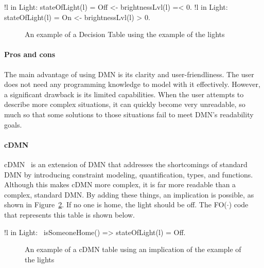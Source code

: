 \documentclass[11pt,a4paper]{report}
\newcommand{\fodot}{FO($\cdot$)\xspace}
\begin{document}
\begin{idplisting}
{
   !l in Light: stateOfLight(l) = Off <- brightnessLvl(l) =< 0.
   !l in Light: stateOfLight(l) = On <- brightnessLvl(l) > 0.
}
\end{idplisting}

\begin{figure}
    \centering
    \caption{An example of a Decision Table using the example of the lights}
    \label{fig:DT}
\end{figure}


\paragraph{ Pros and cons}
The main advantage of using DMN is its clarity and user-friendliness. The user does not need any programming knowledge to model with it effectively. However, a significant drawback is its limited capabilities. When the user attempts to describe more complex situations, it can quickly become very unreadable, so much so that some solutions to those situations fail to meet DMN's readability goals.
 
\paragraph{cDMN}
cDMN~\cite{cDMN} is an extension of DMN that addresses the shortcomings of standard DMN by introducing constraint modeling, quantification, types, and functions. Although this makes cDMN more complex, it is far more readable than a complex, standard DMN. By adding these things, an implication is possible, as shown in Figure~\ref{fig:cDMNTable}. If no one is home, the light should be off. The \fodot code that represents this table is shown below.
 
\begin{idplisting}
!l in Light: ~isSomeoneHome() => stateOfLight(l) = Off.
\end{idplisting}

\begin{figure}
    \centering
    \caption{An example of a cDMN table using an implication of the example of the lights}
    \label{fig:cDMNTable}
\end{figure}
 
\end{document}
